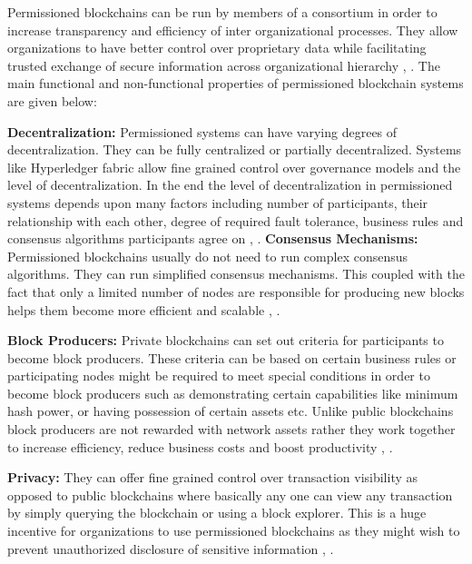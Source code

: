 Permissioned blockchains can be run by members of a consortium in order to increase transparency and efficiency of inter organizational processes. They allow organizations to have better control over proprietary data while facilitating trusted exchange of secure information across organizational hierarchy \cite{arXiv:1806.03693}, \cite{misc:017}. The main functional and non-functional properties of permissioned blockchain systems are given below: 

\textbf{Decentralization:}
Permissioned systems can have varying degrees of decentralization. They can be fully centralized or partially decentralized. Systems like Hyperledger fabric allow fine grained control over governance models and the level of decentralization. In the end the level of decentralization in permissioned systems depends upon many factors including number of participants, their relationship with each other, degree of required fault tolerance, business rules and consensus algorithms participants agree on \cite{arXiv:1806.03693}, \cite{misc:017}.
\clearpage
\textbf{Consensus Mechanisms:}
Permissioned blockchains usually do not need to run complex consensus algorithms. They can run simplified consensus mechanisms. This coupled with the fact that only a limited number of nodes are responsible for producing new blocks helps them become more efficient and scalable \cite{arXiv:1806.03693}, \cite{misc:017}. 

\textbf{Block Producers:}
Private blockchains can set out criteria for participants to become block producers. These criteria can be based on certain business rules or participating nodes might be required to meet special conditions in order to become block producers such as demonstrating certain capabilities like minimum hash power, or having possession of certain assets etc. Unlike public blockchains block producers are not rewarded with network assets rather they work together to increase efficiency, reduce business costs and boost productivity \cite{arXiv:1806.03693}, \cite{misc:017}.
   
\textbf{Privacy:}
They can offer fine grained control over transaction visibility as opposed to public blockchains where basically any one can view any transaction by simply querying the blockchain or using a block explorer. This is a huge incentive for organizations to use permissioned blockchains as they might wish to prevent unauthorized disclosure of sensitive information \cite{arXiv:1806.03693}, \cite{misc:017}.
\clearpage
